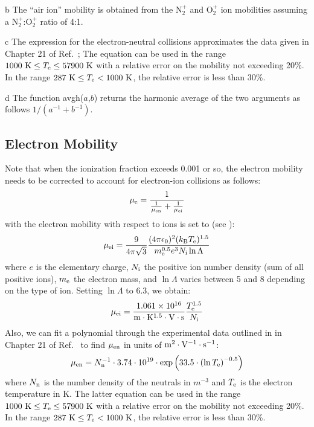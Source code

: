 \documentclass{warpdoc}
\begin{document}
\begin{table*}[b]
\begin{threeparttable}
\begin{tablenotes}
      \item[b] The ``air ion'' mobility is obtained from the N$_2^+$ and O$_2^+$ ion mobilities assuming a N$_2^+$:O$_2^+$ ratio of 4:1. 
      \item[c] The expression for the electron-neutral collisions approximates the data given in Chapter 21 of Ref.\ \cite{book:1997:grigoriev}; The equation can be used in the range $1000~{\rm K} \le T_{\rm e} \le 57900 ~{\rm K}$ with a relative error on the mobility not exceeding 20\%. In the range $287~{\rm K} \le T_{\rm e} < 1000~{\rm K}$, the relative error is less than 30\%. 
      \item[d] The function avgh($a$,$b$) returns the harmonic average of the two arguments as follows $1/(a^{-1}+b^{-1})$.
    \end{tablenotes}
   \end{threeparttable}
\end{table*}
%

\subsection{Electron Mobility}

Note that when the ionization fraction exceeds 0.001 or so, the electron mobility needs to be corrected to account for electron-ion collisions as follows:
%
\begin{equation}
\mu_{\rm e}=\frac{1}{\frac{1}{\mu_{\rm en}}+\frac{1}{\mu_{\rm ei}}}
\end{equation}
%
with the electron mobility with respect to ions is set to (see \cite[page 180--181]{book:1984:chen}):
%
\begin{equation}
\mu_{\rm ei} = \frac{9}{4\pi\sqrt{3}} \frac{(4\pi\epsilon_0)^2 (k_{\rm B}T_{\rm e})^{1.5}}{m_{\rm e}^{0.5} e^3 N_{\rm i} \ln \Lambda}
\end{equation}
%
where $e$ is the elementary charge, $N_{\rm i}$ the positive ion number density (sum of all positive ions), $m_{\rm e}$ the electron mass, and $\ln \Lambda$ varies between 5 and 8 depending on the type of ion. Setting $\ln \Lambda$ to 6.3, we obtain:
%
\begin{equation}
\mu_{\rm ei}= \frac{1.061 \times 10^{16}}{\rm m\cdot K^{1.5}\cdot V \cdot s} \frac{T_{\rm e}^{1.5}}{N_{\rm i}}
\end{equation}
%
Also, we can fit a polynomial through the experimental data outlined in in Chapter 21 of Ref.\ \cite{book:1997:grigoriev} to find $\mu_{\rm en}$ in units of $\rm m^2\cdot V^{-1}\cdot s^{-1}$:
%
\begin{equation}
\mu_{\rm en}=N_{\rm n}^{-1} \cdot 3.74\cdot 10^{19} \cdot {\rm exp}\left(33.5 \cdot \left({\rm ln}\, T_{\rm e} \right)^{-0.5}\right)
\end{equation}
%
where $N_{\rm n}$ is the number density of the neutrals in $m^{-3}$ and $T_{\rm e}$ is the electron temperature in K.
The latter equation can be used in the range $1000~{\rm K} \le T_{\rm e} \le 57900 ~{\rm K}$ with a relative error on the mobility not exceeding 20\%. In the range $287~{\rm K} \le T_{\rm e} < 1000~{\rm K}$, the relative error is less than 30\%. 
\end{document}
